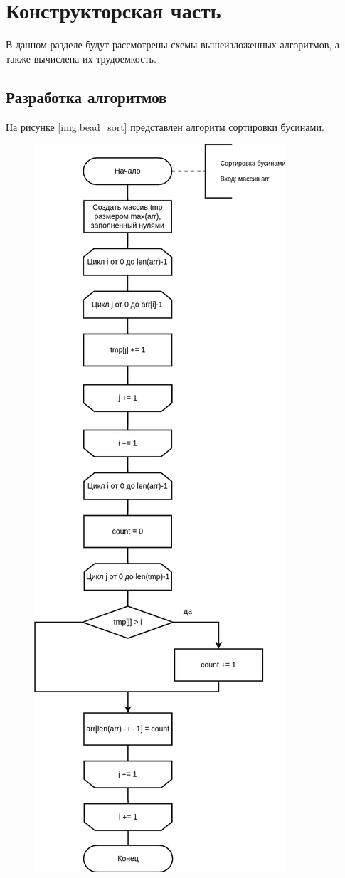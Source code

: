 \chapter{Конструкторская часть}

В данном разделе будут рассмотрены схемы вышеизложенных алгоритмов, а также вычислена их трудоемкость.

\section{Разработка алгоритмов}

На рисунке \ref{img:bead_sort} представлен алгоритм сортировки бусинами.

\begin{figure}[H]
	\begin{center}
		\includegraphics[scale=0.51]{img/bead_sort.png}

\end{center}
\end{figure}

